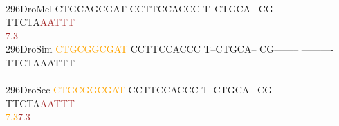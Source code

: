 \documentclass[11pt,twoside,reqno,a4paper]{article}
\begin{document}
{\\
296\hspace*{1\charwidth}DroMel	CTGCAGCGAT	CCTTCCACCC	T--CTGCA--	CG--------	----------	TTCTA\textcolor{brown}{A}\textcolor{brown}{A}\textcolor{brown}{T}\textcolor{brown}{T}\textcolor{brown}{T}	\\
\hspace*{4\charwidth}\hspace*{7\charwidth}\hspace*{1\charwidth}\hspace*{1\charwidth}\hspace*{1\charwidth}\hspace*{1\charwidth}\hspace*{1\charwidth}\hspace*{55\charwidth}\textcolor{brown}{7.3}\hspace*{1\charwidth}\\
296\hspace*{1\charwidth}DroSim	\textcolor{orange}{C}\textcolor{orange}{T}\textcolor{orange}{G}\textcolor{orange}{C}\textcolor{orange}{G}\textcolor{orange}{G}\textcolor{orange}{C}\textcolor{orange}{G}\textcolor{orange}{A}\textcolor{orange}{T}	CCTTCCACCC	T--CTGCA--	CG--------	----------	TTCTAAATTT	\\
\hspace*{4\charwidth}\hspace*{7\charwidth}\hspace*{1\charwidth}\hspace*{1\charwidth}\hspace*{1\charwidth}\hspace*{1\charwidth}\hspace*{1\charwidth}\hspace*{1\charwidth}\\
296\hspace*{1\charwidth}DroSec	\textcolor{orange}{C}\textcolor{orange}{T}\textcolor{orange}{G}\textcolor{orange}{C}\textcolor{orange}{G}\textcolor{orange}{G}\textcolor{orange}{C}\textcolor{orange}{G}\textcolor{orange}{A}\textcolor{orange}{T}	CCTTCCACCC	T--CTGCA--	CG--------	----------	TTCTA\textcolor{brown}{A}\textcolor{brown}{A}\textcolor{brown}{T}\textcolor{brown}{T}\textcolor{brown}{T}	\\
\hspace*{4\charwidth}\hspace*{7\charwidth}\hspace*{0\charwidth}\textcolor{orange}{7.3}\hspace*{1\charwidth}\hspace*{1\charwidth}\hspace*{1\charwidth}\hspace*{1\charwidth}\hspace*{1\charwidth}\hspace*{52\charwidth}\textcolor{brown}{7.3}\hspace*{1\charwidth}\\
}
\end{document}
